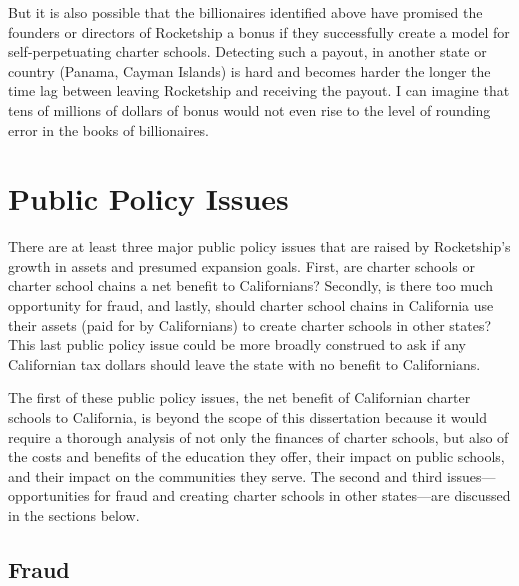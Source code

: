 But it is also possible that the billionaires identified above have promised the founders or directors of Rocketship a bonus if they successfully create a model for self-perpetuating charter schools. Detecting such a payout, in another state or country (Panama, Cayman Islands) is hard and becomes harder the longer the time lag between leaving Rocketship and receiving the payout. I can imagine that tens of millions of dollars of bonus would not even rise to the level of rounding error in the books of billionaires.

\section{Public Policy Issues}%
\label{sec:publ-policy-chang}\indent%

There are at least three major public policy issues that are raised by Rocketship's growth in assets and presumed expansion goals. First, are charter schools or charter school chains a net benefit to Californians? Secondly, is there too much opportunity for fraud, and lastly, should charter school chains in California use their assets (paid for by Californians) to create charter schools in other states? This last public policy issue could be more broadly construed to ask if any Californian tax dollars should leave the state with no benefit to Californians.

The first of these public policy issues, the net benefit of Californian charter schools to California, is beyond the scope of this dissertation because it would require a thorough analysis of not only the finances of charter schools, but also of the costs and benefits of the education they offer, their impact on public schools, and their impact on the communities they serve. The second and third issues—opportunities for fraud and creating charter schools in other states—are discussed in the sections below.

\subsection{Fraud}%
\label{sec:fraud}\indent%


